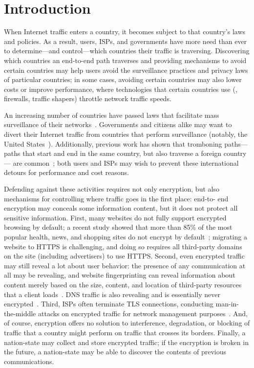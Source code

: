 \section{Introduction}
\label{intro}

When Internet traffic enters a country, it becomes subject to that country's
laws and policies.  As a result, users, ISPs, and governments have more need
than ever to determine---and control---which countries their traffic is
traversing.  Discovering which countries an end-to-end path traverses and
providing mechanisms to avoid certain countries may help users avoid the
surveillance practices and privacy laws of particular countries; in some
cases, avoiding certain countries may also lower costs or improve performance,
where technologies that certain countries use (\ie, firewalls, traffic
shapers) throttle network traffic speeds. 

An increasing number of countries have passed laws that facilitate mass
surveillance of their networks~\cite{france_surveillance,
netherlands_surveillance, kazak_surveillance, uk_bill}. Governments and
citizens alike may want to divert their Internet traffic from countries that
perform surveillance (notably, the United States~\cite{russia_secure_internet,
routing_errors, dte}).   Additionally, previous work has shown that tromboning
paths---paths that start and end in the same country, but also traverse a
foreign country--- are common~\cite{shah2015characterizing, gupta2014peering};
both users and ISPs may wish to prevent these international detours for
performance and cost reasons.

Defending against these activities requires not only encryption, but
also mechanisms for controlling where traffic goes in the first place: end-to-
end encryption may conceals some information content, but it does not protect
all sensitive information.  First, many websites do not fully support
encrypted browsing by default; a recent study showed that more than 85\% of
the most popular health, news, and shopping sites do not encrypt by
default~\cite{what_isps_can_see}; migrating a website to HTTPS is challenging,
and doing so requires all third-party domains on the site (including
advertisers) to use HTTPS.  Second, even encrypted traffic may still reveal a
lot about user behavior: the presence of any communication at all may be
revealing, and website fingerprinting can reveal information about content
merely based on the size, content, and location of third-party resources that
a client loads~\cite{Johnson2013a}. DNS traffic is also revealing and is
essentially never encrypted~\cite{what_isps_can_see}.  Third, ISPs often
terminate TLS connections, conducting man-in-the-middle attacks on encrypted
traffic for network management purposes~\cite{mitm_isp}.  And, of course,
encryption offers no solution to interference, degradation, or blocking of
traffic that a country might perform on traffic that crosses its borders.
Finally, a nation-state may collect and store encrypted traffic; if the
encryption is broken in the future, a nation-state may be able to discover the
contents of previous communications.

